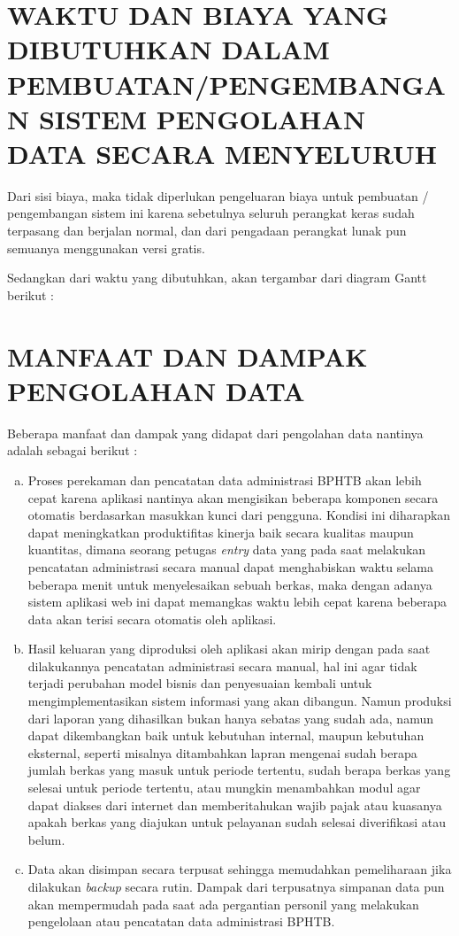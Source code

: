 \documentclass[pdftex,12pt, oneside]{article}
\begin{document}
\section{WAKTU DAN BIAYA YANG DIBUTUHKAN DALAM PEMBUATAN/PENGEMBANGAN SISTEM PENGOLAHAN DATA SECARA MENYELURUH}

Dari sisi biaya, maka tidak diperlukan pengeluaran biaya untuk pembuatan / pengembangan sistem ini karena sebetulnya seluruh perangkat keras sudah terpasang dan berjalan normal, dan dari pengadaan perangkat lunak pun semuanya menggunakan versi gratis.

Sedangkan dari waktu yang dibutuhkan, akan tergambar dari diagram Gantt berikut :



\section{MANFAAT DAN DAMPAK PENGOLAHAN DATA}

Beberapa manfaat dan dampak yang didapat dari pengolahan data nantinya adalah sebagai berikut :

\begin{enumerate}[a.]
  \item Proses perekaman dan pencatatan data administrasi BPHTB akan lebih cepat karena aplikasi nantinya akan mengisikan beberapa komponen secara otomatis berdasarkan masukkan kunci dari pengguna. Kondisi ini diharapkan dapat meningkatkan produktifitas kinerja baik secara kualitas maupun kuantitas, dimana seorang petugas \textit{entry} data yang pada saat melakukan pencatatan administrasi secara manual dapat menghabiskan waktu selama beberapa menit untuk menyelesaikan sebuah berkas, maka dengan adanya sistem aplikasi web ini dapat memangkas waktu lebih cepat karena beberapa data akan terisi secara otomatis oleh aplikasi.
  
  \item Hasil keluaran yang diproduksi oleh aplikasi akan mirip dengan pada saat dilakukannya pencatatan administrasi secara manual, hal ini agar tidak terjadi perubahan model bisnis dan penyesuaian kembali untuk mengimplementasikan sistem informasi yang akan dibangun. Namun produksi dari laporan yang dihasilkan bukan hanya sebatas yang sudah ada, namun dapat dikembangkan baik untuk kebutuhan internal, maupun kebutuhan eksternal, seperti misalnya ditambahkan lapran mengenai sudah berapa jumlah berkas yang masuk untuk periode tertentu, sudah berapa berkas yang selesai untuk periode tertentu, atau mungkin menambahkan modul agar dapat diakses dari internet dan memberitahukan wajib pajak atau kuasanya apakah berkas yang diajukan untuk pelayanan sudah selesai diverifikasi atau belum.
  
\item Data akan disimpan secara terpusat sehingga memudahkan pemeliharaan jika dilakukan \textit{backup} secara rutin. Dampak dari terpusatnya simpanan data pun akan mempermudah pada saat ada pergantian personil yang melakukan pengelolaan atau pencatatan data administrasi BPHTB.

\end{enumerate}
\end{document}

